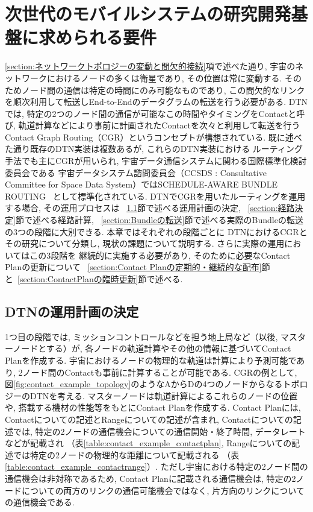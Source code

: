 \chapter{次世代のモバイルシステムの研究開発基盤に求められる要件}
\label{chap:cgr_in_dtn}

\ref{section:ネットワークトポロジーの変動と間欠的接続}項で述べた通り, 
宇宙のネットワークにおけるノードの多くは衛星であり, その位置は常に変動する.  
そのためノード間の通信は特定の時間にのみ可能なものであり, 
この間欠的なリンクを順次利用して転送しEnd-to-Endのデータグラムの転送を行う必要がある.  
DTNでは, 特定の2つのノード間の通信が可能なこの時間やタイミングをContactと呼び, 
軌道計算などにより事前に計画されたContactを次々と利用して転送を行う
Contact Graph Routing（CGR）\cite{Fraire2021}というコンセプトが構想されている.  
既に述べた通り既存のDTN実装は複数あるが, これらのDTN実装における
ルーティング手法でも主にCGRが用いられ, 宇宙データ通信システムに関わる国際標準化検討委員会である
宇宙データシステム諮問委員会（CCSDS : Consultative Committee 
for Space Data System）ではSCHEDULE-AWARE BUNDLE ROUTING
~\cite{schedule_aware_bundle_routing}として標準化されている.  
DTNでCGRを用いたルーティングを運用する場合, その運用プロセスは
~\ref{section:運用計画の決定}節で述べる運用計画の決定, 
~\ref{section:経路決定}節で述べる経路計算, 
~\ref{section:Bundleの転送}節で述べる実際のBundleの転送
の3つの段階に大別できる.  本章ではそれぞれの段階ごとに
DTNにおけるCGRとその研究について分類し, 現状の課題について説明する.  
さらに実際の運用においてはこの3段階を
継続的に実施する必要があり, そのために必要なContact Planの更新について
~\ref{section:Contact Planの定期的・継続的な配布}節と~\ref{section:ContactPlanの臨時更新}節で述べる.  

\section{DTNの運用計画の決定}
\label{section:運用計画の決定}
1つ目の段階では, ミッションコントロールなどを担う地上局など（以後, マスターノードとする）が, 
各ノードの軌道計算やその他の情報に基づいてContact Planを作成する.  
宇宙におけるノードの物理的な軌道は計算により予測可能であり, 
2ノード間のContactも事前に計算することが可能である.   
CGRの例として, 図\ref{fig:contact_example_topology}のようなAからDの4つのノードからなるトポロジーのDTNを考える.  
マスターノードは軌道計算によるこれらのノードの位置や, 搭載する機材の性能等をもとにContact Planを作成する.  
Contact Planには, Contactについての記述とRangeについての記述が含まれ, 
Contactについての記述では, 特定の2ノードの通信機会についての通信開始・終了時間, データレートなどが記載され
（表\ref{table:contact_example_contactplan}, Rangeについての記述では特定の2ノードの物理的な距離について記載される
（表\ref{table:contact_example_contactrange}）.  
ただし宇宙における特定の2ノード間の通信機会は非対称であるため, 
Contact Planに記載される通信機会は, 特定の2ノードについての両方のリンクの通信可能機会ではなく, 
片方向のリンクについての通信機会である. 

